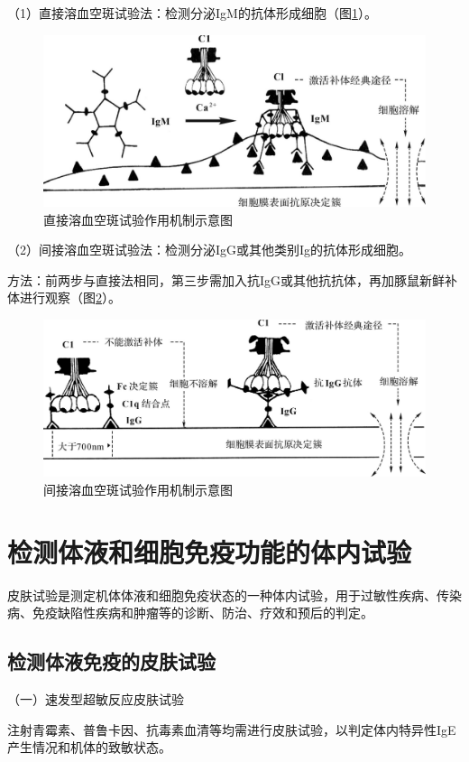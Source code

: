 （1）直接溶血空斑试验法：检测分泌IgM的抗体形成细胞（图\ref{fig10-28}）。

\begin{figure}[!htbp]
 \centering
 \includegraphics[width=.6\textwidth]{./images/Image00182.jpg}
 \captionsetup{justification=centering}
 \caption{直接溶血空斑试验作用机制示意图}
 \label{fig10-28}
  \end{figure} 

（2）间接溶血空斑试验法：检测分泌IgG或其他类别Ig的抗体形成细胞。

方法：前两步与直接法相同，第三步需加入抗IgG或其他抗抗体，再加豚鼠新鲜补体进行观察（图\ref{fig10-29}）。

\begin{figure}[!htbp]
 \centering
 \includegraphics[width=.6\textwidth]{./images/Image00183.jpg}
 \captionsetup{justification=centering}
 \caption{间接溶血空斑试验作用机制示意图}
 \label{fig10-29}
  \end{figure} 

\section{检测体液和细胞免疫功能的体内试验}

皮肤试验是测定机体体液和细胞免疫状态的一种体内试验，用于过敏性疾病、传染病、免疫缺陷性疾病和肿瘤等的诊断、防治、疗效和预后的判定。


\subsection{检测体液免疫的皮肤试验}

（一）速发型超敏反应皮肤试验

注射青霉素、普鲁卡因、抗毒素血清等均需进行皮肤试验，以判定体内特异性IgE产生情况和机体的致敏状态。

